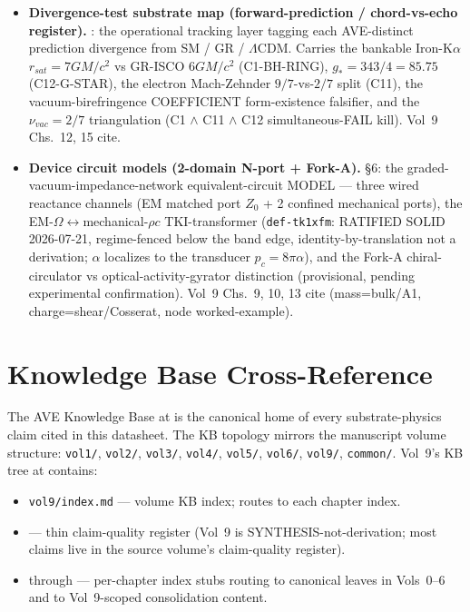 \begin{itemize}
    \item \textbf{Divergence-test substrate map (forward-prediction / chord-vs-echo register).} : the operational tracking layer tagging each AVE-distinct prediction divergence from SM / GR / $\Lambda$CDM. Carries the bankable Iron-K$\alpha$ $r_{sat} = 7GM/c^2$ vs GR-ISCO $6GM/c^2$ (C1-BH-RING), $g_* = 343/4 = 85.75$ (C12-G-STAR), the electron Mach-Zehnder $9/7$-vs-$2/7$ split (C11), the vacuum-birefringence COEFFICIENT form-existence falsifier, and the $\nu_{vac} = 2/7$ triangulation (C1 $\wedge$ C11 $\wedge$ C12 simultaneous-FAIL kill). Vol~9 Chs.~12, 15 cite.
    \item \textbf{Device circuit models (2-domain N-port + Fork-A).}  \S6: the graded-vacuum-impedance-network equivalent-circuit MODEL --- three wired reactance channels (EM matched port $Z_0$ + 2 confined mechanical ports), the EM-$\Omega$$\leftrightarrow$mechanical-$\rho c$ TKI-transformer (\texttt{def-tk1xfm}: RATIFIED SOLID 2026-07-21, regime-fenced below the band edge, identity-by-translation not a derivation; $\alpha$ localizes to the transducer $p_c = 8\pi\alpha$), and the Fork-A chiral-circulator vs optical-activity-gyrator distinction (provisional, pending experimental confirmation). Vol~9 Chs.~9, 10, 13 cite (mass=bulk/A1, charge=shear/Cosserat, node worked-example).
\end{itemize}

\section{Knowledge Base Cross-Reference}
\label{sec:vol9_xref_kb}

The AVE Knowledge Base at  is the canonical home of every substrate-physics claim cited in this datasheet. The KB topology mirrors the manuscript volume structure: \texttt{vol1/}, \texttt{vol2/}, \texttt{vol3/}, \texttt{vol4/}, \texttt{vol5/}, \texttt{vol6/}, \texttt{vol9/}, \texttt{common/}. Vol~9's KB tree at  contains:

\begin{itemize}
    \item \texttt{vol9/index.md} --- volume KB index; routes to each chapter index.
    \item {} --- thin claim-quality register (Vol~9 is SYNTHESIS-not-derivation; most claims live in the source volume's claim-quality register).
    \item {} through  --- per-chapter index stubs routing to canonical leaves in Vols~0--6 and to Vol~9-scoped consolidation content.
\end{itemize}

